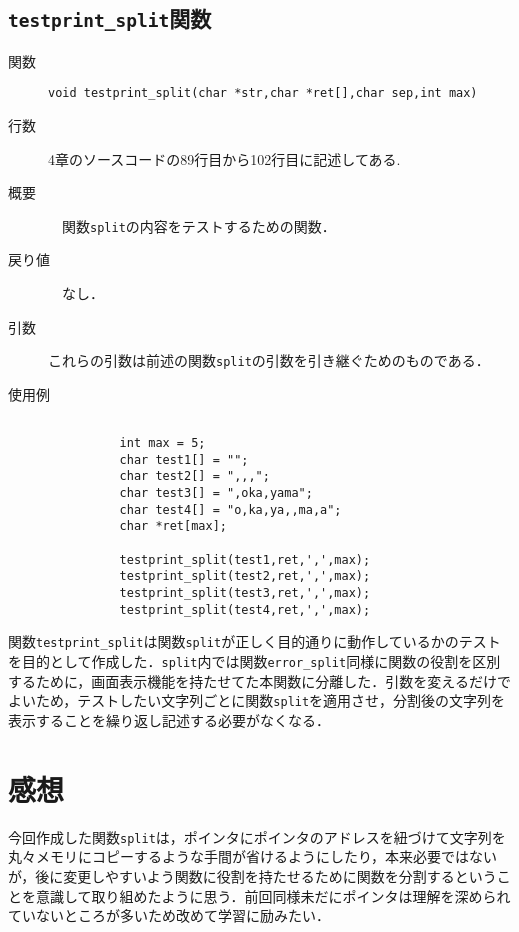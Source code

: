 \documentclass[a4j,11pt]{jarticle}
\begin{document}
\subsection{\texttt{testprint\_split}関数}
 \begin{description}
    \item[関数] \verb|void testprint_split(char *str,char *ret[],char sep,int max)|
    \item[行数]  4章のソースコードの89行目から102行目に記述してある. 
    \item[概要]　関数\verb|split|の内容をテストするための関数．
    \item[戻り値]　なし．
    \item[引数]  これらの引数は前述の関数\verb|split|の引数を引き継ぐためのものである．
    \item[使用例]
      \begin{verbatim}

          int max = 5;
          char test1[] = "";
          char test2[] = ",,,";
          char test3[] = ",oka,yama";
          char test4[] = "o,ka,ya,,ma,a";
          char *ret[max];
    
          testprint_split(test1,ret,',',max);
          testprint_split(test2,ret,',',max);
          testprint_split(test3,ret,',',max);
          testprint_split(test4,ret,',',max);
      \end{verbatim}
\end{description}
関数\verb|testprint_split|は関数\verb|split|が正しく目的通りに動作しているかのテストを目的として作成した．\verb|split|内では関数\verb|error_split|同様に関数の役割を区別するために，画面表示機能を持たせてた本関数に分離した．引数を変えるだけでよいため，テストしたい文字列ごとに関数\verb|split|を適用させ，分割後の文字列を表示することを繰り返し記述する必要がなくなる．


\section{感想}
今回作成した関数\verb|split|は，ポインタにポインタのアドレスを紐づけて文字列を丸々メモリにコピーするような手間が省けるようにしたり，本来必要ではないが，後に変更しやすいよう関数に役割を持たせるために関数を分割するということを意識して取り組めたように思う．前回同様未だにポインタは理解を深められていないところが多いため改めて学習に励みたい．
\end{document}
